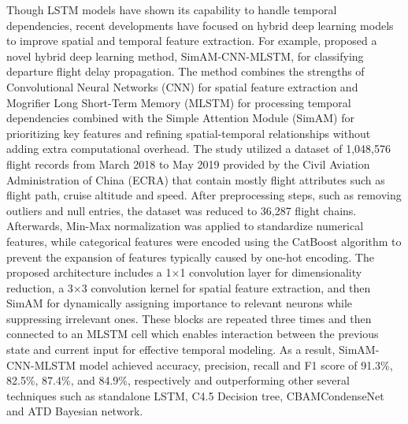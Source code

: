 \documentclass[twoside,11pt]{article}
\begin{document}
Though LSTM models have shown its capability to handle temporal dependencies, recent developments have focused on hybrid deep learning models to improve spatial and temporal feature extraction. For example, \cite{qu2023flight} proposed a novel hybrid deep learning method, SimAM-CNN-MLSTM, for classifying departure flight delay propagation. The method combines the strengths of Convolutional Neural Networks (CNN) for spatial feature extraction and Mogrifier Long Short-Term Memory (MLSTM) for processing temporal dependencies combined with the Simple Attention Module (SimAM) for prioritizing key features and refining spatial-temporal relationships without adding extra computational overhead. The study utilized a dataset of 1,048,576 flight records from March 2018 to May 2019 provided by the Civil Aviation Administration of China (ECRA) that contain mostly flight attributes such as flight path, cruise altitude and speed. After preprocessing steps, such as removing outliers and null entries, the dataset was reduced to 36,287 flight chains. Afterwards, Min-Max normalization was applied to standardize numerical features, while categorical features were encoded using the CatBoost algorithm to prevent the expansion of features typically caused by one-hot encoding. The proposed architecture includes a 1×1 convolution layer for dimensionality reduction, a 3×3 convolution kernel for spatial feature extraction, and then SimAM for dynamically assigning importance to relevant neurons while suppressing irrelevant ones. These blocks are repeated three times and then connected to an MLSTM cell which enables interaction between the previous state and current input for effective temporal modeling. As a result, SimAM-CNN-MLSTM model achieved accuracy, precision, recall and F1 score of 91.3\%, 82.5\%, 87.4\%, and 84.9\%, respectively and outperforming other several techniques such as standalone LSTM, C4.5 Decision tree, CBAMCondenseNet and ATD Bayesian network.  
\end{document}
